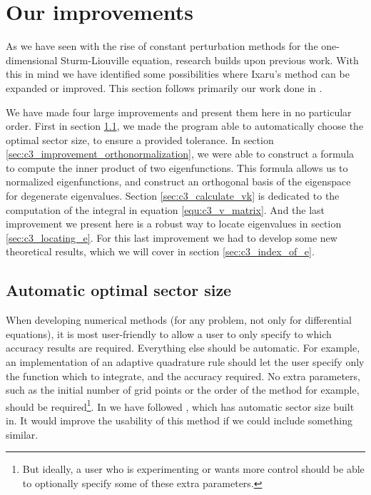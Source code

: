 \section{Our improvements}\label{sec:c3_improvements}

As we have seen with the rise of constant perturbation methods for the one-dimensional Sturm-Liouville equation, research builds upon previous work. With this in mind we have identified some possibilities where Ixaru's method can be expanded or improved. This section follows primarily our work done in \cite{baeyens_fast_2020}.

We have made four large improvements and present them here in no particular order. First in section \ref{sec:c3_improvement_automatic_sectors}, we made the program able to automatically choose the optimal sector size, to ensure a provided tolerance. In section \ref{sec:c3_improvement_orthonormalization}, we were able to construct a formula to compute the inner product of two eigenfunctions. This formula allows us to normalized eigenfunctions, and construct an orthogonal basis of the eigenspace for degenerate eigenvalues. Section \ref{sec:c3_calculate_vk} is dedicated to the computation of the integral in equation \eqref{equ:c3_v_matrix}. And the last improvement we present here is a robust way to locate eigenvalues in section \ref{sec:c3_locating_e}. For this last improvement we had to develop some new theoretical results, which we will cover in section \ref{sec:c3_index_of_e}. 


\subsection{Automatic optimal sector size}\label{sec:c3_improvement_automatic_sectors}

When developing numerical methods (for any problem, not only for differential equations), it is most user-friendly to allow a user to only specify to which accuracy results are required. Everything else should be automatic. For example, an implementation of an adaptive quadrature rule should let the user specify only the function which to integrate, and the accuracy required. No extra parameters, such as the initial number of grid points or the order of the method for example, should be required\footnote{But ideally, a user who is experimenting or wants more control should be able to optionally specify some of these extra parameters.}. In  we have followed , which has automatic sector size built in. It would improve the usability of this method if we could include something similar.


